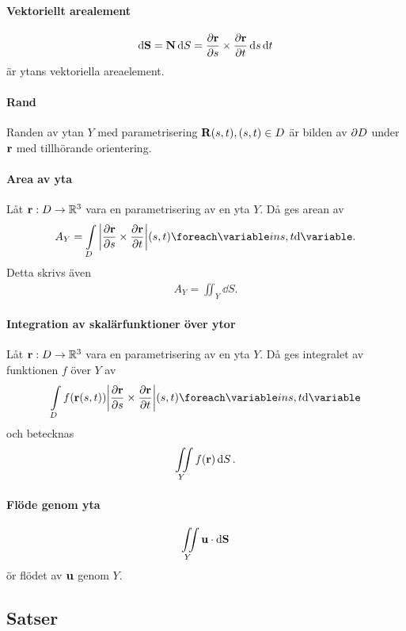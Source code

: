 \paragraph{Vektoriellt arealement}
\begin{align*}
	\dd{\vect{S}} = \vect{N}\dd{S} = \pdv{\vect{r}}{s}\times\pdv{\vect{r}}{t}\dd{s}\dd{t}
\end{align*}
är ytans vektoriella areaelement.

\paragraph{Rand}
Randen av ytan $Y$ med parametrisering $\vect{R}(s, t), (s, t)\in D$ är bilden av $\partial D$ under $\vect{r}$ med tillhörande orientering.

\paragraph{Area av yta}
Låt $\vect{r}: D\to\R^3$ vara en parametrisering av en yta $Y$. Då ges arean av
\begin{align*}
	A_Y = \inteval{D}{\abs{\pdv{\vect{r}}{s}\times\pdv{\vect{r}}{t}}}{{s, t}}. 
\end{align*}
Detta skrivs även
\begin{align*}
	A_Y = \iint_{Y}\dd{S}.
\end{align*}

\paragraph{Integration av skalärfunktioner över ytor}
Låt $\vect{r}: D\to\R^3$ vara en parametrisering av en yta $Y$. Då ges integralet av funktionen $f$ över $Y$ av
\begin{align*}
	\inteval{D}{f(\vect{r}(s, t))\abs{\pdv{\vect{r}}{s}\times\pdv{\vect{r}}{t}}}{{s, t}}
\end{align*}
och betecknas
\begin{align*}
	\iint\limits_{Y}f(\vect{r})\dd{S}.
\end{align*}

\paragraph{Flöde genom yta}
\begin{align*}
	\fint{Y}{\vect{u}}{\vect{S}}
\end{align*}
ör flödet av $\vect{u}$ genom $Y$.

\subsection{Satser}